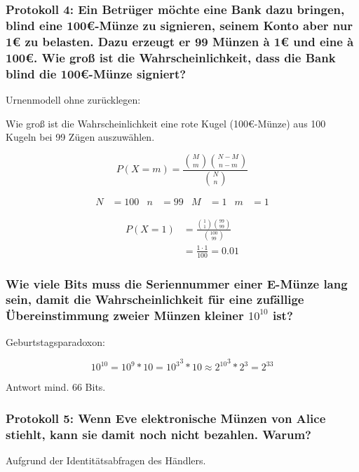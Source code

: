 \subsubsection{Protokoll 4: Ein Betrüger möchte eine Bank dazu bringen, blind eine 100€-Münze zu signieren, seinem Konto aber nur 1€ zu belasten. Dazu erzeugt er 99 Münzen à 1€ und eine à 100€. Wie groß ist die Wahrscheinlichkeit, dass die Bank blind die 100€-Münze signiert?}

Urnenmodell ohne zurücklegen:



Wie groß ist die Wahrscheinlichkeit eine rote Kugel (100€-Münze) aus 100 Kugeln bei 99 Zügen auszuwählen.

\begin{equation}
	P(X=m) = \frac{ \binom{M}{m} \binom{N-M}{n-m} }{ \binom{N}{n}}
\end{equation}

\begin{align}
	N &= 100 & n&=99 &  M &= 1 & m &= 1
\end{align}

\begin{align}
	P(X=1) &= \frac{ \binom{1}{1} \binom{99}{99} }{ \binom{100}{99}} \\
		   &= \frac{1 \cdot 1}{100} = 0.01
\end{align}

\subsubsection{Wie viele Bits muss die Seriennummer einer E-Münze lang sein, damit die Wahrscheinlichkeit für eine zufällige Übereinstimmung zweier Münzen kleiner $10^{10}$ ist?}

Geburtstagsparadoxon:

\[
	10^{10} = 10^9 * 10 = {10^3}^{3} *10  \approx {2^10}^3 * 2^3 = 2^33
\]

Antwort mind. 66 Bits.

\subsubsection{Protokoll 5: Wenn Eve elektronische Münzen von Alice stiehlt, kann sie damit noch nicht bezahlen. Warum?}

Aufgrund der Identitätsabfragen des Händlers.

